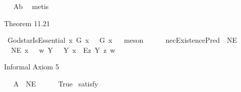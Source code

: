 \begin{isabellebody}
\isadelimproof
\ %
\endisadelimproof
%
\isatagproof
{}\isamarkupfalse%
\ A{}b\ \isamarkupfalse%
\ metis%
\endisatagproof
{\isafoldproof}%
%
\isadelimproof
%
\endisadelimproof
%
\begin{isamarkuptext}%
Theorem 11.21%
\end{isamarkuptext}\isamarkuptrue%
\isamarkupfalse%
\ God{\isacharunderscore}starIsEssential{\isacharcolon}\ {\isachardoublequoteopen}{\isasymlfloor}\isactrlbold {\isasymforall}x{\isachardot}\ G{\isacharasterisk}\ x\ \isactrlbold {\isasymrightarrow}\ {\isacharparenleft}{\isacharparenleft}{\isasymE}\ {\isasymdown}G{\isacharasterisk}{\isacharparenright}\ x{\isacharparenright}{\isasymrfloor}{\isachardoublequoteclose}%
\isadelimproof
\ %
\endisadelimproof
%
\isatagproof
{}\isamarkupfalse%
\ meson%
\endisatagproof
{\isafoldproof}%
%
\isadelimproof
%
\endisadelimproof
\isanewline
\ \ \ \ \isanewline
{}\isamarkupfalse%
\ necExistencePred{\isacharcolon}{\isacharcolon}\ {\isachardoublequoteopen}{\isasymup}{\isasymlangle}{\isasymzero}{\isasymrangle}{\isachardoublequoteclose}\ {\isacharparenleft}{\isachardoublequoteopen}NE{\isachardoublequoteclose}{\isacharparenright}\ \isanewline
\ \ {\isachardoublequoteopen}NE\ x\ \ {\isasymequiv}\ {\isasymlambda}w{\isachardot}\ {\isacharparenleft}\isactrlbold {\isasymforall}Y{\isachardot}\ \ {\isasymE}\ Y\ x\ \isactrlbold {\isasymrightarrow}\ \isactrlbold {\isasymbox}{\isacharparenleft}\isactrlbold {\isasymexists}\isactrlsup Ez{\isachardot}\ {\isasymlparr}Y\ z{\isasymrparr}{\isacharparenright}{\isacharparenright}\ w{\isachardoublequoteclose}%
\begin{isamarkuptext}%
\bigbreak%
\end{isamarkuptext}\isamarkuptrue%
%
\begin{isamarkuptext}%
Informal Axiom 5%
\end{isamarkuptext}\isamarkuptrue%
\isamarkupfalse%
\ \isanewline
\ A{}{\isacharcolon}\ {\isachardoublequoteopen}{\isasymlfloor}{\isasymP}\ {\isasymdown}NE{\isasymrfloor}{\isachardoublequoteclose}\isanewline
\ \ \ \ \isanewline
{}\isamarkupfalse%
\ True\ \isamarkupfalse%
{\isacharbrackleft}satisfy{\isacharbrackright}%
\isadelimproof
\ %
\endisadelimproof
%
\isatagproof
{}\isamarkupfalse%
\ %
%
\endisatagproof
{\isafoldproof}%
%
\isadelimproof

\end{isabellebody}
